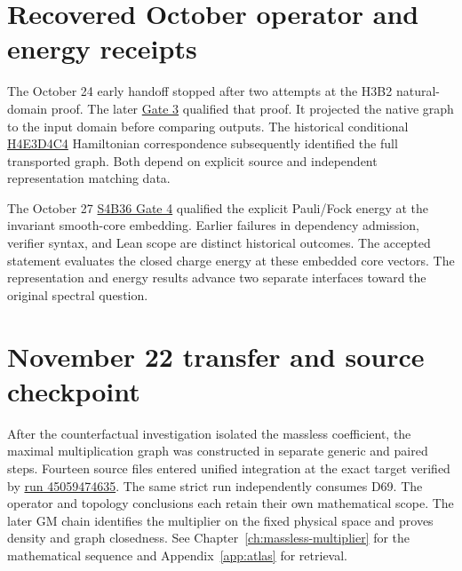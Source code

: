 \section{Recovered October operator and energy receipts}
The October 24 early handoff stopped after two attempts at the
H3B2 natural-domain proof. The later
\href{https://github.com/etblink/Foundational-Convergence-Program/actions/runs/40075765703}{Gate 3}
qualified that proof. It projected the native graph to the input
domain before comparing outputs. The historical conditional
\href{https://github.com/etblink/Foundational-Convergence-Program/actions/runs/40143986830}{H4E3D4C4}
Hamiltonian correspondence subsequently identified the full
transported graph. Both depend on explicit source and independent
representation matching data.

The October 27
\href{https://github.com/etblink/Foundational-Convergence-Program/actions/runs/40472176948}{S4B36 Gate 4}
qualified the explicit Pauli/Fock energy at the invariant smooth-core
embedding. Earlier failures in dependency admission, verifier
syntax, and Lean scope are distinct historical outcomes. The accepted
statement evaluates the closed charge energy at these embedded core
vectors. The representation and energy results advance two separate
interfaces toward the original spectral question.

\section{November 22 transfer and source checkpoint}
After the counterfactual investigation isolated the massless
coefficient, the maximal multiplication graph was constructed in
separate generic and paired steps. Fourteen source files entered
unified integration at the exact target verified by
\href{https://github.com/etblink/math/actions/runs/45059474635}{run 45059474635}.
The same strict run independently consumes D69. The operator
and topology conclusions each retain their own mathematical scope.
The later GM chain identifies the multiplier on the fixed physical
space and proves density and graph closedness. See
Chapter~\ref{ch:massless-multiplier} for the mathematical sequence
and Appendix~\ref{app:atlas} for retrieval.
